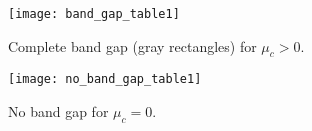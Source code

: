 \documentclass[
10pt, %
a4paper, %
oneside, %
headinclude,footinclude, %
BCOR5mm, %
table,
]{scrartcl}
\begin{document}
\begin{figure}
	\begin{center}
		\texttt{[image: band\_gap\_table1]}
	\end{center}
	\vspace{-4mm}
	\caption{Complete band gap (gray rectangles) for $ \mu_c >0 $.}
	\label{fig.band_gap}
\end{figure}


\begin{figure}
	\begin{center}
		\texttt{[image: no\_band\_gap\_table1]}
	\end{center}
	\vspace{-4mm}
	\caption{No band gap for $ \mu_c = 0$.}
	\label{fig.no_band_gap}
\end{figure}

\printbibliography
\end{document}
